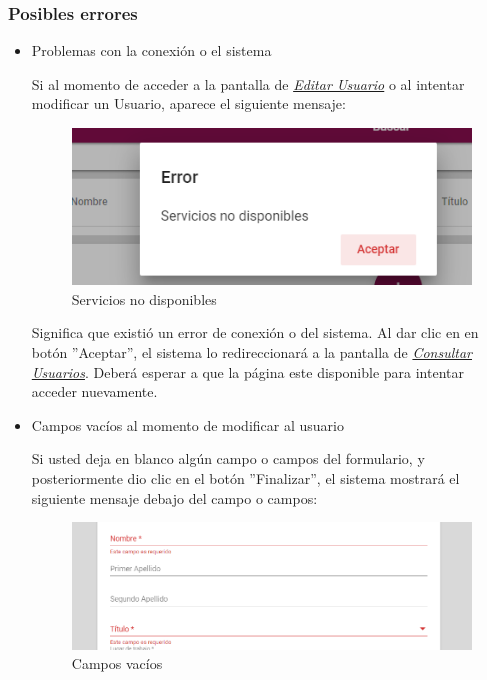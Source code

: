                 \subsubsection{Posibles errores}
                    \begin{itemize}
                        \item Problemas con la conexión o el sistema

                            Si al momento de acceder a la pantalla de \hyperlink{editarUs}{\textit{Editar Usuario}} o al intentar modificar un Usuario, aparece el siguiente mensaje:
                            \clearpage
                            \begin{figure}[H]
                            	\centering
                            	\includegraphics[width=0.4\linewidth]{images/SP5/MSGSN}
                            	\caption{Servicios no disponibles}

                            \end{figure}


                            Significa que existió un error de conexión o del sistema. Al dar clic en en botón ''Aceptar'', el sistema lo redireccionará  a la pantalla de \hyperlink{consultarUs}{\textit{Consultar Usuarios}}. Deberá esperar a que la página este disponible para intentar acceder nuevamente.

                        \item Campos vacíos al momento de modificar al usuario

                            Si usted deja en blanco algún campo o campos del formulario, y posteriormente dio clic en el botón ''Finalizar'', el sistema mostrará el siguiente mensaje debajo del campo o campos:

                          \begin{figure}[H]
                         	\centering
                         	\includegraphics[width=0.4\linewidth]{images/SP5/MSG44}
                         	\caption{Campos vacíos}
                         	\label{mensaje44}


\end{figure}
\end{itemize}
